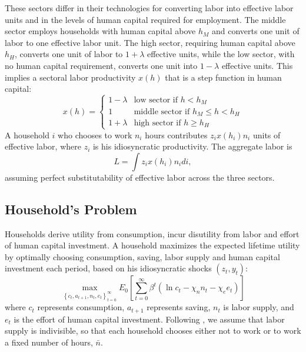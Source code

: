 \documentclass[12pt,english]{article}
\numberwithin{equation}{section}
\begin{document}
These sectors differ in their technologies for converting labor into effective labor units and in the levels of human capital required for employment. 
The middle sector employs households with human capital above $h_M$ and converts one unit of labor to one effective labor unit. The high sector, requiring human capital above $h_H$, converts one unit of labor to $1+\lambda$ effective units, while the low sector, with no human capital requirement, converts one unit into $1-\lambda$ effective units. This implies a sectoral labor productivity $x(h)$ that is a step function in human capital:
\begin{equation}
    \label{eq:x}
x(h)=\left \{ 
\begin{array}{cl}
1-\lambda  & \text{low sector if }h<h_{M} \\ 
1 & \text{middle sector if }h_{M} \leq h<h_{H} \\ 
1+\lambda  & \text{high sector if }h \geq h_{H}%
\end{array}%
\right. 
\end{equation}
A household $i$ who chooses to work $n_i$ hours contributes $z_ix(h_i)n_i$ units of effective labor, where $z_i$ is his idiosyncratic productivity. The aggregate labor is
\begin{equation}
    L=\int z_ix(h_i)n_idi,
\end{equation}
assuming perfect substitutability of effective labor across the three sectors.

\subsection{Household's Problem}
Households derive utility from consumption, incur disutility from labor and effort of human capital investment. 
A household maximizes the expected lifetime utility by optimally choosing consumption, saving, labor supply and human capital investment each period, based on his idiosyncratic shocks $(z_t,y_t)$:
\begin{equation}
\max_{\left \{ c_t,a_{t+1},n_t,e_t\right \}_{t=0}^{\infty }}E_0\left[
\sum\limits_{t=0}^{\infty }\beta^t( \ln c_t-\chi_n n_t-\chi_e e_t ) \right] 
\end{equation}
where $c_t$ represents consumption, $a_{t+1}$ represents saving, $n_t$ is labor supply, and $e_t$ is the effort of human capital investment. Following \citet{Chang2006}, we assume that labor supply is indivisible, so that each household chooses either not to work or to work a fixed number of hours, $\bar{n}$.
\end{document}
